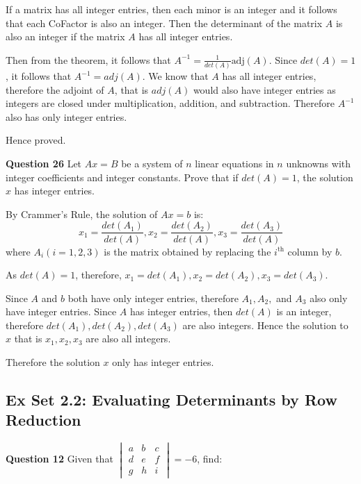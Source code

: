 \documentclass[addpoints]{exam}
\begin{document}
\begin{sloppypar}
\begin{questions}
\begin{solution}
        If a matrix has all integer entries, then each minor is an integer and it follows that each CoFactor is also an integer. Then the determinant of the matrix $A$ is also an integer if the matrix $A$ has all integer entries. 

        Then from the theorem, it follows that $ A^{-1} = \frac{1}{det(A)} \text{adj}(A)$. Since $det(A) = 1$, it follows that $ A^{-1} = adj(A) $. We know that $A$ has all integer entries, therefore the adjoint of $A$, that is $adj(A)$ would also have integer entries as integers are closed under multiplication, addition, and subtraction. Therefore $A^{-1}$ also has only integer entries. 

        Hence proved.
    \end{solution}
    \pagebreak
    \question
    \textbf{Question 26} Let $Ax = B$ be a system of $n$ linear equations in $n$ unknowns with integer coefficients and integer constants. Prove that if $ det(A) = 1 $, the solution $x$ has integer entries.
    \begin{solution}
        By Crammer's Rule, the solution of $Ax = b$ is:
        $$ x_1 = \displaystyle\frac{det(A_1)}{det(A)}, x_2 = \displaystyle\frac{det(A_2)}{det(A)}, x_3 = \displaystyle\frac{det(A_3)}{det(A)} $$
        where $A_i(i = 1, 2, 3)$ is the matrix obtained by replacing the $i^{\text{th}}$ column by $b$.

        As $det(A) = 1$, therefore, $ x_1 = det(A_1), x_2 = det(A_2), x_3 = det(A_3) $. 

        Since $A$ and $b$ both have only integer entries, therefore $A_1, A_2, $ and $A_3$ also only have integer entries. Since $A$ has integer entries, then $det(A)$ is an integer, therefore $det(A_1), det(A_2), det(A_3)$ are also integers. Hence the solution to $x$ that is $ x_1, x_2, x_3 $ are also all integers. 

        Therefore the solution $x$ only has integer entries.
    \end{solution}

\vspace*{5mm}
\subsection*{Ex Set 2.2: Evaluating Determinants by Row Reduction}
    \question
    \textbf{Question 12} Given that $\begin{vmatrix}
        a & b & c \\ d & e & f \\ g & h & i
    \end{vmatrix} = -6 $, find:


\end{questions}
\end{sloppypar}
\end{document}
